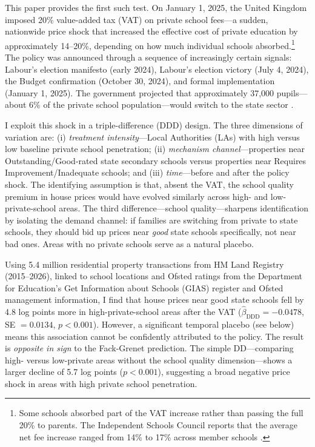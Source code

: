 \documentclass[12pt]{article}
\begin{document}
This paper provides the first such test. On January 1, 2025, the United Kingdom imposed 20\% value-added tax (VAT) on private school fees---a sudden, nationwide price shock that increased the effective cost of private education by approximately 14--20\%, depending on how much individual schools absorbed.\footnote{Some schools absorbed part of the VAT increase rather than passing the full 20\% to parents. The Independent Schools Council reports that the average net fee increase ranged from 14\% to 17\% across member schools \citep{isc2025}.} The policy was announced through a sequence of increasingly certain signals: Labour's election manifesto (early 2024), Labour's election victory (July 4, 2024), the Budget confirmation (October 30, 2024), and formal implementation (January 1, 2025). The government projected that approximately 37,000 pupils---about 6\% of the private school population---would switch to the state sector \citep{hcl2024}.

I exploit this shock in a triple-difference (DDD) design. The three dimensions of variation are: (i) \textit{treatment intensity}---Local Authorities (LAs) with high versus low baseline private school penetration; (ii) \textit{mechanism channel}---properties near Outstanding/Good-rated state secondary schools versus properties near Requires Improvement/Inadequate schools; and (iii) \textit{time}---before and after the policy shock. The identifying assumption is that, absent the VAT, the school quality premium in house prices would have evolved similarly across high- and low-private-school areas. The third difference---school quality---sharpens identification by isolating the demand channel: if families are switching from private to state schools, they should bid up prices near \textit{good} state schools specifically, not near bad ones. Areas with no private schools serve as a natural placebo.

Using 5.4 million residential property transactions from HM Land Registry (2015--2026), linked to school locations and Ofsted ratings from the Department for Education's Get Information about Schools (GIAS) register and Ofsted management information, I find that house prices near good state schools fell by 4.8 log points more in high-private-school areas after the VAT ($\hat{\beta}_{\text{DDD}} = -0.0478$, SE $= 0.0134$, $p < 0.001$). However, a significant temporal placebo (see below) means this association cannot be confidently attributed to the policy. The result is \textit{opposite in sign} to the Fack-Grenet prediction. The simple DD---comparing high- versus low-private areas without the school quality dimension---shows a larger decline of 5.7 log points ($p < 0.001$), suggesting a broad negative price shock in areas with high private school penetration.
\end{document}
